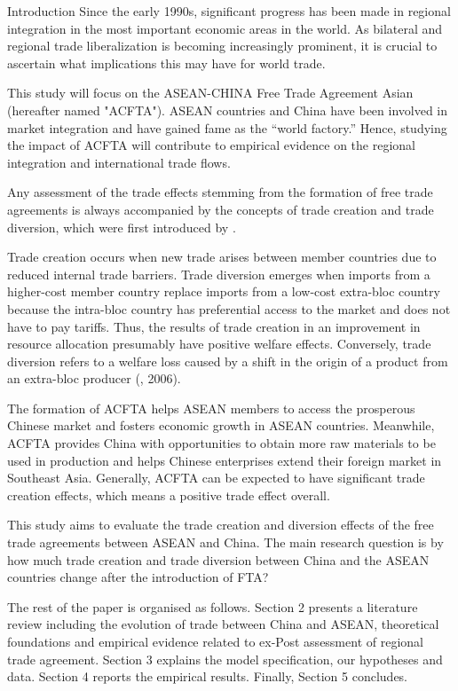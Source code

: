 \begin{section}{Introduction}
Since the early 1990s, significant progress has been made in regional integration in the most important economic areas in the world. As bilateral and regional trade liberalization is becoming increasingly prominent, it is crucial to ascertain what implications this may have for world trade.

This study will focus on the ASEAN-CHINA Free Trade Agreement Asian (hereafter named "ACFTA"). ASEAN countries and China have been involved in market integration and have gained fame as the “world factory.” Hence, studying the impact of ACFTA will contribute to empirical evidence on the regional integration and international trade flows. 

Any assessment of the trade effects stemming from the formation of free trade agreements is always accompanied by the concepts of trade creation and trade diversion, which were first introduced by \cite{viner1950}.

Trade creation occurs when new trade arises between member countries due to reduced internal trade barriers. Trade diversion emerges when imports from a higher-cost member country replace imports from a low-cost extra-bloc country because the intra-bloc country has preferential access to the market and does not have to pay tariffs. Thus, the results of trade creation in an improvement in resource allocation presumably have positive welfare effects. Conversely, trade diversion refers to a welfare loss caused by a shift in the origin of a product from an extra-bloc producer (\citeauthor{carrere_2006}, 2006).

The formation of ACFTA helps ASEAN members to access the prosperous Chinese market and fosters economic growth in ASEAN countries. Meanwhile, ACFTA provides China with opportunities to obtain more raw materials to be used in production and helps Chinese enterprises extend their foreign market in Southeast Asia. Generally, ACFTA can be expected to have significant trade creation effects, which means a positive trade effect overall.

This study aims to evaluate the trade creation and diversion effects of the free trade agreements between ASEAN and China. The main research question is by how much trade creation and trade diversion between China and the ASEAN countries change after the introduction of FTA?

The rest of the paper is organised as follows. Section 2 presents a literature review including the evolution of trade between China and ASEAN, theoretical foundations and empirical evidence related to ex-Post assessment of regional trade agreement. Section 3 explains the model specification, our hypotheses and data. Section 4 reports the empirical results. Finally, Section 5 concludes.

\end{section}